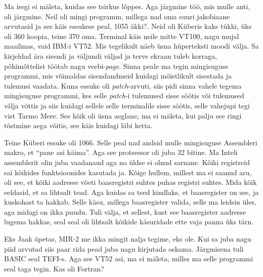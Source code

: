 Ma isegi ei  mäleta, kuidas see tsirkus lõppes. Aga järgmine töö, mis mulle anti, oli järgmine. Neil oli mingi programm, millega nad oma suuri jakobiaane arvutasid ja  see käis essukese peal, 1055 äkki?. Neid oli Küberis kaks tükki, üks oli 360 koopia, teine 370 oma. Terminal käis neile mitte VT100, nagu mujal maailmas, vaid IBM-i VT52. Mis tegelikult näeb  üsna hüperteksti moodi välja. Sa kirjeldad ära sisendi  ja väljundi väljad ja terve ekraan tuleb korraga, põhimõttelist töötab nagu veebi-\emph{page}. Sinna peale ma tegin mingisuguse programmi, mis võimaldas sisendandmeid kuidagi mõistlikult  sisestada ja tulemusi vaadata. Kuna essuke oli \emph{patch}-arvuti, siis pidi sinna vahele tegema mingisuguse programmi, kes selle \emph{patch}-i tulemused sisse söötis või tulemused välja võttis ja siis kuidagi sellele selle terminalile sisse söötis, selle vahejupi tegi vist Tarmo Mere. See kõik oli üsna aeglane, ma ei mäleta, kui palju see ringi tõstmine aega võitis, see käis kuidagi läbi ketta.

Teine Küberi essuke oli 1066. Selle peal nad andsid mulle mingisuguse Assembleri makro, et \enquote{pane asi käima}. Aga see protsessor oli juba 32 bitine. Ma Inteli assemblerit olin juba vaadanaud aga no üldse ei olnud sarnane. Kõiki registreid sai kõikides funktsioonides kasutada ja. Kõige hullem, millest ma ei saanud aru, oli see, et kõiki  aadresse võeti baasregistri suhtes puhas registri suhtes. Mida kõik eeldasid, et sa lihtsalt tead.  Aga kuidas sa teed kindlaks, et baasregister on see, ja kuskohast ta hakkab. Selle käsu, millega baasregister valida, selle ma leidsin üles, aga midagi on ikka puudu. Tuli välja, et sellest, kust see baasregister  aadresse lugema hakkas, seal seal oli lihtsalt kõikide käsuridade ette vaja panna üks tärn.
                 

Eks Jaak õpetas, MIR-2 me ikka mingit nalja tegime, eks ole. Kui sa juba nagu piid arvutad siis paar rida pead juba nagu kirjutada oskama. Järgmisena tuli BASIC seal TEFI-s. Aga see VT52 asi, ma ei mäleta, milles ma selle programmi seal taga tegin. Kas oli Fortran? 


